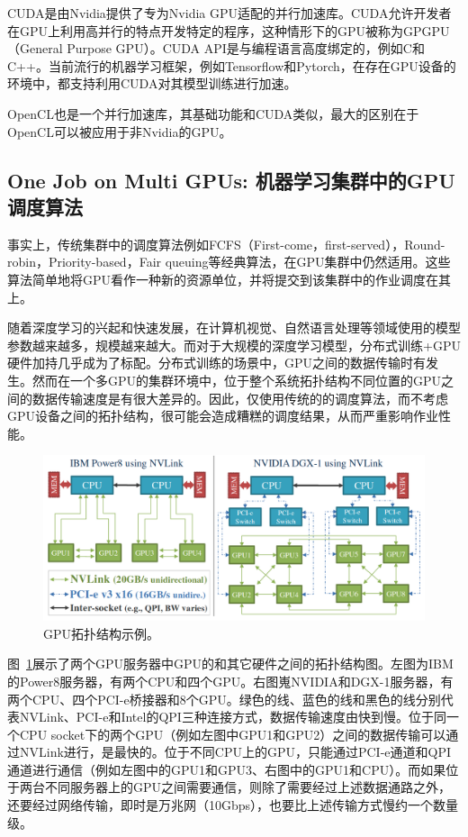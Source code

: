 CUDA是由Nvidia提供了专为Nvidia GPU适配的并行加速库。CUDA允许开发者在GPU上利用高并行的特点开发特定的程序，这种情形下的GPU被称为GPGPU（General Purpose GPU）。CUDA API是与编程语言高度绑定的，例如C和C++。当前流行的机器学习框架，例如Tensorflow和Pytorch，在存在GPU设备的环境中，都支持利用CUDA对其模型训练进行加速。

OpenCL也是一个并行加速库，其基础功能和CUDA类似，最大的区别在于OpenCL可以被应用于非Nvidia的GPU。

\subsection{One Job on Multi GPUs: 机器学习集群中的GPU调度算法}
事实上，传统集群中的调度算法例如FCFS（First-come，first-served），Round-robin，Priority-based，Fair queuing\parencite{demers1989analysis}等经典算法，在GPU集群中仍然适用。这些算法简单地将GPU看作一种新的资源单位，并将提交到该集群中的作业调度在其上。

随着深度学习的兴起和快速发展，在计算机视觉、自然语言处理等领域使用的模型参数越来越多，规模越来越大。而对于大规模的深度学习模型，分布式训练+GPU硬件加持几乎成为了标配。分布式训练的场景中，GPU之间的数据传输时有发生。然而在一个多GPU的集群环境中，位于整个系统拓扑结构不同位置的GPU之间的数据传输速度是有很大差异的。因此，仅使用传统的的调度算法，而不考虑GPU设备之间的拓扑结构，很可能会造成糟糕的调度结果，从而严重影响作业性能。

\begin{figure}[h]
    \centerline{\includegraphics[width=\textwidth]{figures/gpu-topology.png}}
    \caption{GPU拓扑结构示例。}
    \label{gpu_topology}
\end{figure}

图~\ref{gpu_topology}展示了两个GPU服务器中GPU的和其它硬件之间的拓扑结构图。左图为IBM的Power8服务器，有两个CPU和四个GPU。右图嵬NVIDIA和DGX-1服务器，有两个CPU、四个PCI-e桥接器和8个GPU。绿色的线、蓝色的线和黑色的线分别代表NVLink\parencite{foley2017ultra}、PCI-e和Intel的QPI三种连接方式，数据传输速度由快到慢。位于同一个CPU socket下的两个GPU（例如左图中GPU1和GPU2）之间的数据传输可以通过NVLink进行，是最快的。位于不同CPU上的GPU，只能通过PCI-e通道和QPI通道进行通信（例如左图中的GPU1和GPU3、右图中的GPU1和CPU）。而如果位于两台不同服务器上的GPU之间需要通信，则除了需要经过上述数据通路之外，还要经过网络传输，即时是万兆网（10Gbps），也要比上述传输方式慢约一个数量级。

